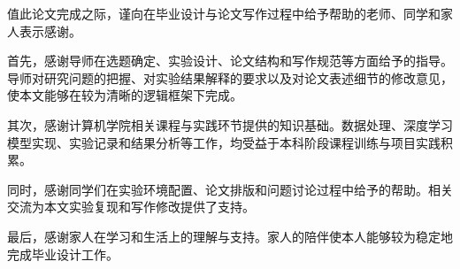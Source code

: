 %
%
%
%
%
%

\begin{acknowledgements}
  值此论文完成之际，谨向在毕业设计与论文写作过程中给予帮助的老师、同学和家人表示感谢。

  首先，感谢导师在选题确定、实验设计、论文结构和写作规范等方面给予的指导。导师对研究问题的把握、对实验结果解释的要求以及对论文表述细节的修改意见，使本文能够在较为清晰的逻辑框架下完成。

  其次，感谢计算机学院相关课程与实践环节提供的知识基础。数据处理、深度学习模型实现、实验记录和结果分析等工作，均受益于本科阶段课程训练与项目实践积累。

  同时，感谢同学们在实验环境配置、论文排版和问题讨论过程中给予的帮助。相关交流为本文实验复现和写作修改提供了支持。

  最后，感谢家人在学习和生活上的理解与支持。家人的陪伴使本人能够较为稳定地完成毕业设计工作。
\end{acknowledgements}
